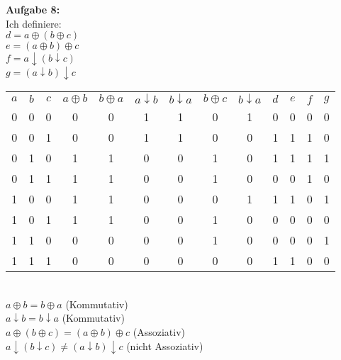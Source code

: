 \documentclass[a4paper]{scrartcl}
\begin{document}
	\begin{flushleft}
		\textbf{Aufgabe 8:}\\[1em]
		Ich definiere: \\
		$d = a\oplus (b \oplus c)$\\
		$e = (a\oplus b) \oplus c$\\
		$f = a\downarrow (b \downarrow c)$\\
		$g = (a\downarrow b) \downarrow c$\\[1em]
		\begin{tabular}{|c|c|c|c|c|c|c|c|c|c|c|c|c|}
			$a$ & $b$ & $c$ & $a\oplus b$ & $b\oplus a$ & $a\downarrow b$ & $b\downarrow a$ & $b\oplus c$ & $b\downarrow a$ & $d$ & $e$ & $f$ & $g$ \\
			0 & 0 & 0 & 0 & 0 & 1 & 1 & 0 & 1 & 0 & 0 & 0 & 0 \\
			0 & 0 & 1 & 0 & 0 & 1 & 1 & 0 & 0 & 1 & 1 & 1 & 0 \\
			0 & 1 & 0 & 1 & 1 & 0 & 0 & 1 & 0 & 1 & 1 & 1 & 1 \\
			0 & 1 & 1 & 1 & 1 & 0 & 0 & 1 & 0 & 0 & 0 & 1 & 0 \\
			1 & 0 & 0 & 1 & 1 & 0 & 0 & 0 & 1 & 1 & 1 & 0 & 1 \\
			1 & 0 & 1 & 1 & 1 & 0 & 0 & 1 & 0 & 0 & 0 & 0 & 0 \\
			1 & 1 & 0 & 0 & 0 & 0 & 0 & 1 & 0 & 0 & 0 & 0 & 1 \\
			1 & 1 & 1 & 0 & 0 & 0 & 0 & 0 & 0 & 1 & 1 & 0 & 0 \\
		 \end{tabular}\\[1em]
		$a\oplus b = b\oplus a$ (Kommutativ)\\
		$a\downarrow b = b\downarrow a$ (Kommutativ)\\
		$a\oplus (b \oplus c) = (a\oplus b) \oplus c$ (Assoziativ)\\
		$a\downarrow (b \downarrow c) \neq (a\downarrow b) \downarrow c$ (nicht Assoziativ)\\
 	\end{flushleft}
\end{document}
